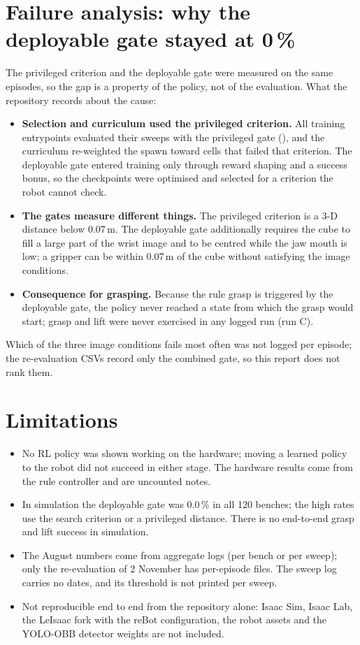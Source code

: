 \documentclass[conference,10pt]{IEEEtran}
\begin{document}
\section{Failure analysis: why the deployable gate stayed at 0\,\%}\label{sec:failure}
The privileged criterion and the deployable gate were measured on the same episodes, so the gap is a property of the
policy, not of the evaluation. What the repository records about the cause:
\begin{itemize}
\item \textbf{Selection and curriculum used the privileged criterion.} All training entrypoints evaluated their sweeps
  with the privileged gate (), and the curriculum re-weighted the spawn toward cells that failed
  that criterion. The deployable gate entered training only through reward shaping and a success bonus, so the
  checkpoints were optimised and selected for a criterion the robot cannot check.
\item \textbf{The gates measure different things.} The privileged criterion is a 3-D distance below 0.07\,m. The
  deployable gate additionally requires the cube to fill a large part of the wrist image and to be centred while the
  jaw mouth is low; a gripper can be within 0.07\,m of the cube without satisfying the image conditions.
\item \textbf{Consequence for grasping.} Because the rule grasp is triggered by the deployable gate, the policy never
  reached a state from which the grasp would start; grasp and lift were never exercised in any logged run (run C).
\end{itemize}
Which of the three image conditions fails most often was not logged per episode; the re-evaluation CSVs record only the
combined gate, so this report does not rank them.

\section{Limitations}\label{sec:limits}
\begin{itemize}
\item No RL policy was shown working on the hardware; moving a learned policy to the robot did not succeed in
  either stage. The hardware results come from the rule controller and are uncounted notes.
\item In simulation the deployable gate was 0.0\,\% in all 120 benches; the high rates use the search criterion or a
  privileged distance. There is no end-to-end grasp and lift success in simulation.
\item The August numbers come from aggregate logs (per bench or per sweep); only the re-evaluation of 2 November has
  per-episode files. The sweep log carries no dates, and its threshold is not printed per sweep.
\item Not reproducible end to end from the repository alone: Isaac Sim, Isaac Lab, the LeIsaac fork with the reBot
  configuration, the robot assets and the YOLO-OBB detector weights are not included.
\end{itemize}
\end{document}
